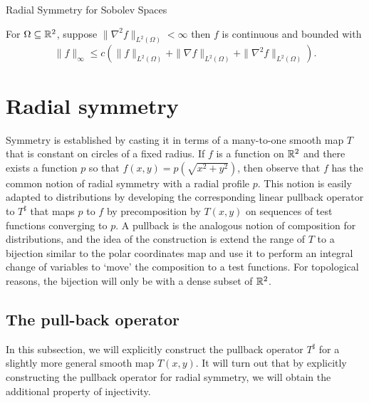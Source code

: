 \begin{chapter}{Radial Symmetry for Sobolev Spaces}
\begin{cor}
  For $\Omega \subseteq \mathbb R^2$, suppose $\|\nabla^2 f\|_{L^2(\Omega)} < \infty$ then $f$ is continuous and bounded with  
  \begin{equation}
    \| f \|_\infty \le c\left(\|f\|_{L^2(\Omega)} + \| \nabla f\|_{L^2(\Omega)}+ \| \nabla^2 f\|_{L^2(\Omega)}\right).
  \end{equation}
\end{cor}

\section{Radial symmetry}
Symmetry is established by casting it in terms of a many-to-one smooth map $T$ that is constant on circles of a fixed radius.  
If $f$ is a function on $\mathbb R^2$ and there exists a function $p$ so that $f(x,y) = p(\sqrt{x^2 + y^2})$, then observe that $f$ has the common notion of radial symmetry with a radial profile $p$.
This notion is easily adapted to distributions by developing the corresponding linear pullback operator to $T^\sharp$ that maps $p$ to $f$ by precomposition by $T(x,y)$ on sequences of test functions converging to $p$.
A pullback is the analogous notion of composition for distributions, and the idea of the construction is extend the range of $T$ to a bijection similar to the polar coordinates map and use it to perform an integral change of variables to `move' the composition to a test functions.
For topological reasons, the bijection will only be with a dense subset of $\mathbb R^2$.

\subsection{The pull-back operator}
In this subsection, we will explicitly construct the pullback operator $T^\sharp$ for a slightly more general smooth map $T(x,y)$. 
It will turn out that by explicitly constructing the pullback operator for radial symmetry, we will obtain the additional property of injectivity.


\end{chapter}
